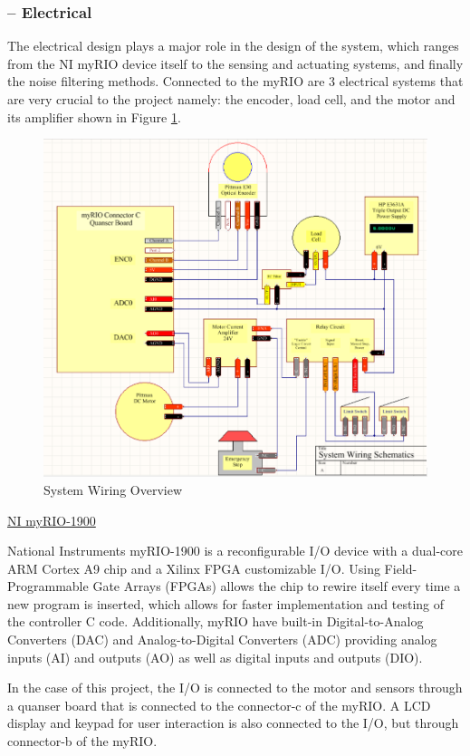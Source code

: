 \subsubsection*{ -- Electrical}\par

The electrical design plays a major role in the design of the system, which ranges from the NI myRIO device itself to the sensing and actuating systems, and finally the noise filtering methods. Connected to the myRIO are 3 electrical systems that are very crucial to the project namely: the encoder, load cell, and the motor and its amplifier shown in Figure \ref{Wiring_Toon}.\par
\begin{figure}[htbp]
\begin{center}
\includegraphics[width=1\linewidth]{Images/Cartoon_Electrical.PNG}
\caption{System Wiring Overview}
\label{Wiring_Toon}
\end{center}
\end{figure}
\vspace{.167in}
\noindent\underline{NI myRIO-1900} \par
\vspace{.08in}
National Instruments myRIO-1900 is a reconfigurable I/O device with a dual-core ARM Cortex A9 chip and a Xilinx FPGA customizable I/O. Using Field-Programmable Gate Arrays (FPGAs) allows the chip to rewire itself every time a new program is inserted, which allows for faster implementation and testing of the controller C code. Additionally, myRIO have built-in Digital-to-Analog Converters (DAC) and Analog-to-Digital Converters (ADC) providing analog inputs (AI) and outputs (AO) as well as digital inputs and outputs (DIO).\par In the case of this project, the I/O is connected to the motor and sensors through a quanser board that is connected to the connector-c of the myRIO. A LCD display and keypad for user interaction is also connected to the I/O, but through connector-b of the myRIO.\par

